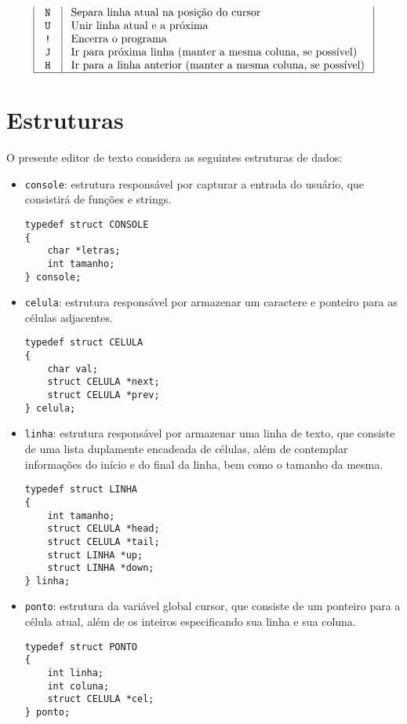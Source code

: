 \documentclass[a4paper, 11pt]{article}
\begin{document}
$$\begin{array}{|c|l|}
\texttt{ N } & \text { Separa linha atual na posição do cursor } \\
\texttt{ U } & \text { Unir linha atual e a próxima } \\
\texttt{!} & \text { Encerra o programa } \\
\texttt{ J } & \text { Ir para próxima linha (manter a mesma coluna, se possível) } \\
\texttt{ H } & \text { Ir para a linha anterior (manter a mesma coluna, se possível) } \\
\hline
\end{array}
$$

\section{Estruturas}

O presente editor de texto considera as seguintes estruturas de dados:
\begin{itemize}%
	\item \texttt{console}: estrutura responsável por capturar a entrada do usuário, que consistirá de funções e strings.

	\begin{lstlisting}[name=console,
		language={[ansi]C},
		frame=trBL,
		firstnumber=1]
typedef struct CONSOLE
{
    char *letras;
    int tamanho;
} console;
		\end{lstlisting}
	\item \texttt{celula}: estrutura responsável por armazenar um caractere e ponteiro para as células adjacentes.
	\begin{lstlisting}[name=console,
		language={[ansi]C},
		frame=trBL,
		firstnumber=1]
typedef struct CELULA
{
	char val;
	struct CELULA *next;
	struct CELULA *prev;
} celula;
		\end{lstlisting}
	\item \texttt{linha}: estrutura responsável por armazenar uma linha de texto, que consiste de uma lista duplamente encadeada de células, além de contemplar informações do início e do final da linha, bem como o tamanho da mesma.
	\begin{lstlisting}[name=console,
		language={[ansi]C},
		frame=trBL,
		firstnumber=1]
typedef struct LINHA
{
	int tamanho;
	struct CELULA *head;
	struct CELULA *tail;
	struct LINHA *up;
	struct LINHA *down;
} linha;
		\end{lstlisting}
	\item \texttt{ponto}: estrutura da variável global cursor, que consiste de um ponteiro para a célula atual, além de os inteiros especificando sua linha e sua coluna. 
	\begin{lstlisting}[name=console,
		language={[ansi]C},
		frame=trBL,
		firstnumber=1]
typedef struct PONTO
{
	int linha;
	int coluna;
	struct CELULA *cel;
} ponto;
		\end{lstlisting}
\end{itemize}
\end{document}
